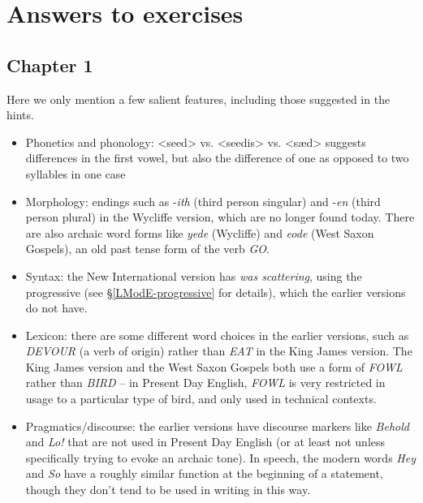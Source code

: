 \chapter*{Answers to exercises}\label{answers}

\section*{Chapter 1}

\noindent\textbf{}\label{sower-answers}

\noindent Here we only mention a few salient features, including those suggested in the hints.
\begin{itemize}
    \item Phonetics and phonology: <seed> vs. <seedis> vs. <sæd> suggests differences in the first vowel, but also the difference of one as opposed to two syllables in one case
    \item Morphology: endings such as -\emph{ith} (third person singular) and -\emph{en} (third person plural) in the Wycliffe version, which are no longer found today. There are also archaic word forms like \emph{yede} (Wycliffe) and \emph{eode} (West Saxon Gospels), an old past tense form of the verb \emph{GO}.
    \item Syntax: the New International version has \emph{was scattering}, using the progressive (see §\ref{LModE-progressive} for details), which the earlier versions do not have.
    \item Lexicon: there are some different word choices in the earlier versions, such as \emph{DEVOUR} (a verb of  origin) rather than \emph{EAT} in the King James version. The King James version and the West Saxon Gospels both use a form of \emph{FOWL} rather than \emph{BIRD} -- in Present Day English, \emph{FOWL} is very restricted in usage to a particular type of bird, and only used in technical contexts.
    \item Pragmatics/discourse: the earlier versions have discourse markers like \emph{Behold} and \emph{Lo!} that are not used in Present Day English (or at least not unless specifically trying to evoke an archaic tone). In speech, the modern words \emph{Hey} and \emph{So} have a roughly similar function at the beginning of a statement, though they don't tend to be used in writing in this way.
\end{itemize}

